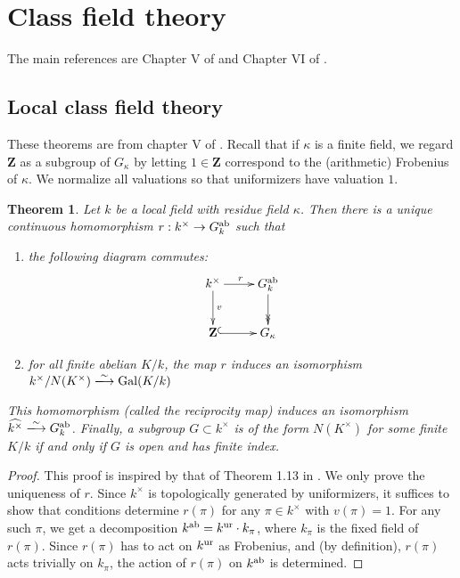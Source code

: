 \documentclass{article}
\DeclareMathOperator{\galois}{Gal}
\newcommand{\dZ}{\mathbf{Z}}
\newcommand{\abelianize}{\textnormal{ab}}
\newcommand{\isomorphism}{\xlongrightarrow{\sim}}
\newcommand{\unramified}{\textnormal{ur}}
\newtheorem{theorem}[subsubsection]{Theorem}
\theoremstyle{definition}
\begin{document}
\section{Class field theory}

The main references are Chapter V of \cite{ne99} and Chapter VI of 
\cite{cf86}. 


\subsection{Local class field theory}

These theorems are from chapter V of \cite{ne99}. Recall that if $\kappa$ is a 
finite field, we regard $\dZ$ as a subgroup of $G_\kappa$ by letting $1\in \dZ$ 
correspond to the (arithmetic) Frobenius of $\kappa$. We normalize all 
valuations so that uniformizers have valuation $1$. 

\begin{theorem}
Let $k$ be a local field with residue field $\kappa$. Then there is a unique 
continuous homomorphism $r:k^\times \to G_k^\abelianize$ such that 
\begin{enumerate}
  \item the following diagram commutes:
    \[\xymatrix{
      k^\times \ar[r]^r \ar[d]^-v 
        & G_k^\abelianize \ar@{->>}[d] \\
      \dZ \ar@{^{(}->}[r] 
        & G_\kappa
    }\]
  \item for all finite abelian $K/k$, the map $r$ induces an isomorphism 
    $k^\times/N(K^\times) \isomorphism \galois(K/k)$
\end{enumerate}
This homomorphism (called the \emph{reciprocity map}) induces an isomorphism 
$\widehat{k^\times} \isomorphism G_k^\abelianize$. Finally, a subgroup 
$G\subset k^\times$ is of the form $N(K^\times)$ for some finite $K/k$ if and 
only if $G$ is open and has finite index. 
\end{theorem}
\begin{proof}
This proof is inspired by that of Theorem 1.13 in \cite{mi-cft}. 
We only prove the uniqueness of $r$. Since $k^\times$ is topologically 
generated by uniformizers, it suffices to show that conditions determine 
$r(\pi)$ for any $\pi\in k^\times$ with $v(\pi)=1$.  For any such $\pi$, we 
get a decomposition $k^\abelianize = k^\unramified \cdot k_\pi$, where $k_\pi$ 
is the fixed field of $r(\pi)$. Since $r(\pi)$ has to act on $k^\unramified$ as 
Frobenius, and (by definition), $r(\pi)$ acts trivially on $k_\pi$, the action 
of $r(\pi)$ on $k^\abelianize$ is determined. 
\end{proof}
\end{document}
